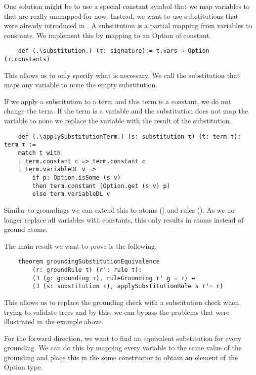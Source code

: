     One solution might be to use a special constant symbol that we map variables to that are really unmapped for now.
    Instead, we want to use substitutions that were already introduced in \cite{datalogCoq}. A substitution is a partial mapping from variables to constants. We implement this by mapping to an Option of constant.

    \begin{lstlisting}
    def (.\substitution.) (τ: signature):= τ.vars → Option (τ.constants)
    \end{lstlisting}

    This allows us to only specify what is necessary. We call the substitution that maps any variable to none the empty substitution.
    
    If we apply a substitution to a term and this term is a constant, we do not change the term. If the term is a variable and the substitution does not map the variable to none we replace the variable with the result of the substitution.

    \begin{lstlisting}
    def (.\applySubstitutionTerm.) (s: substitution τ) (t: term τ): term τ :=
    match t with
    | term.constant c => term.constant c
    | term.variableDL v => 
        if p: Option.isSome (s v) 
        then term.constant (Option.get (s v) p) 
        else term.variableDL v
    \end{lstlisting}

    Similar to groundings we can extend this to atoms (\applySubstitutionAtom) and rules (\applySubstitutionRule). As we no longer replace all variables with constants, this only results in atoms instead of ground atoms.

    The main result we want to prove is the following.

    \begin{lstlisting}
    theorem groundingSubstitutionEquivalence 
        (r: groundRule τ) (r': rule τ):
        (∃ (g: grounding τ), ruleGrounding r' g = r) ↔ 
        (∃ (s: substitution τ), applySubstitutionRule s r'= r)
    \end{lstlisting}

    This allows us to replace the grounding check with a substitution check when trying to validate trees and by this, we can bypass the problems that were illustrated in the example above. 

    For the forward direction, we want to find an equivalent substitution for every grounding. We can do this by mapping every variable to the same value of the grounding and place this in the some constructor to obtain an element of the Option type.

